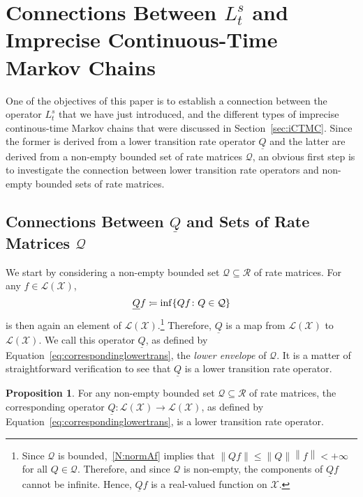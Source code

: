 \documentclass[10pt]{paper}
\theoremstyle{definition}
\newtheorem{proposition}[theorem]{Proposition}
\newcommand{\states}{\mathcal{X}}
\newcommand{\lbound}{L}
\newcommand{\gambles}{\mathcal{L}}
\newcommand{\gamblesX}{\gambles(\states)}
\newcommand{\rateset}{\mathcal{Q}}
\newcommand{\lrate}{\underline{Q}}
\newcommand{\norm}[1]{\left\lVert #1 \right\rVert}
\newcommand{\coloneqq}{:\!=}
\begin{document}
\section{Connections Between $L_t^s$ and Imprecise Continuous-Time Markov Chains}\label{sec:connections}

One of the objectives of this paper is to establish a connection between the operator $\lbound_t^s$ that we have just introduced, and the different types of imprecise continous-time Markov chains that were discussed in Section~\ref{sec:iCTMC}. Since the former is derived from a lower transition rate operator $\lrate$ and the latter are derived from a non-empty bounded set of rate matrices $\rateset$, an obvious first step is to investigate the connection between lower transition rate operators and non-empty bounded sets of rate matrices.

\subsection{Connections Between $\lrate$ and Sets of Rate Matrices $\rateset$}\label{sec:connections_rate}


We start by considering a non-empty bounded set $\rateset\subseteq\mathcal{R}$ of rate matrices. For any $f\in\gamblesX$,
\begin{equation}\label{eq:correspondinglowertrans}
\lrate f\coloneqq\inf\{Qf\colon Q\in\rateset\}\\[2mm]
\end{equation}
is then again an element of $\gamblesX$.\footnote{%
Since $\rateset$ is bounded,~\ref{N:normAf} implies that $\norm{Qf}\leq\norm{Q}\norm{f}<+\infty$ for all $Q\in\rateset$. Therefore, and since $\rateset$ is non-empty, the components of $\lrate f$ cannot be infinite. Hence, $\lrate f$ is a real-valued function on $\states$.}
Therefore, $\lrate$ is a map from $\gamblesX$ to $\gamblesX$. We call this operator $\lrate$, as defined by Equation~\eqref{eq:correspondinglowertrans}, the \emph{lower envelope} of $\rateset$. It is a matter of straightforward verification to see that $\lrate$ is a lower transition rate operator.

\begin{proposition}\label{prop:lowerenvelopeislowertrans}
For any non-empty bounded set $\rateset\subseteq\mathcal{R}$ of rate matrices, the corresponding operator $\lrate\colon\gamblesX\to\gamblesX$, as defined by Equation~\eqref{eq:correspondinglowertrans}, is a lower transition rate operator.
\end{proposition}
\end{document}
